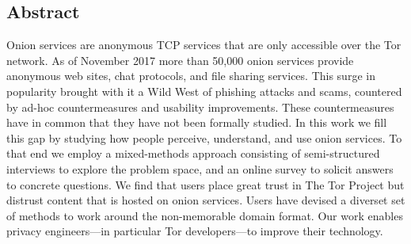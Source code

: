 \subsection*{Abstract}
Onion services are anonymous TCP services that are only accessible over the Tor
network.  As of November 2017 more than 50,000 onion services provide anonymous
web sites, chat protocols, and file sharing services.  This surge in popularity
brought with it a Wild West of phishing attacks and scams, countered by ad-hoc
countermeasures and usability improvements.  These countermeasures have in
common that they have not been formally studied.
In this work we fill this gap by studying how people perceive, understand, and
use onion services.  To that end we employ a mixed-methods approach consisting
of semi-structured interviews to explore the problem space, and an online
survey to solicit answers to concrete questions.  We find that users place great
trust in The Tor Project but distrust content that is hosted on onion services.
Users have devised a diverset set of methods to work around the non-memorable
domain format.
Our work enables privacy engineers---in particular Tor developers---to improve
their technology.
